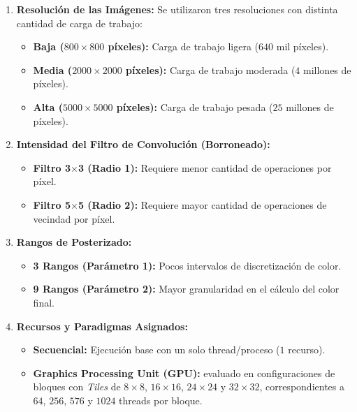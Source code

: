 \begin{enumerate}
    \item \textbf{Resolución de las Imágenes:} Se utilizaron tres resoluciones con distinta cantidad de carga de trabajo:
    \begin{itemize}
        \item \textbf{Baja ($800 \times 800$ píxeles):} Carga de trabajo ligera ($640$ mil píxeles).
        \item \textbf{Media ($2000 \times 2000$ píxeles):} Carga de trabajo moderada ($4$ millones de píxeles).
        \item \textbf{Alta ($5000 \times 5000$ píxeles):} Carga de trabajo pesada ($25$ millones de píxeles).
    \end{itemize}
    
    \item \textbf{Intensidad del Filtro de Convolución (Borroneado):}
    \begin{itemize}
        \item \textbf{Filtro 3$\times$3 (Radio 1):} Requiere menor cantidad de operaciones por píxel.
        \item \textbf{Filtro 5$\times$5 (Radio 2):} Requiere mayor cantidad de operaciones de vecindad por píxel.
    \end{itemize}
    
    \item \textbf{Rangos de Posterizado:}
    \begin{itemize}
        \item \textbf{3 Rangos (Parámetro 1):} Pocos intervalos de discretización de color.
        \item \textbf{9 Rangos (Parámetro 2):} Mayor granularidad en el cálculo del color final.
    \end{itemize}

    \item \textbf{Recursos y Paradigmas Asignados:}
    \begin{itemize}
        \item \textbf{Secuencial:} Ejecución base con un solo thread/proceso ($1$ recurso).
        \item \textbf{Graphics Processing Unit (GPU):} evaluado en configuraciones de bloques con \textit{Tiles} de $8\times8$, $16\times16$, $24\times24$ y $32\times32$, correspondientes a $64$, $256$, $576$ y $1024$ threads por bloque.
    \end{itemize}
\end{enumerate}

